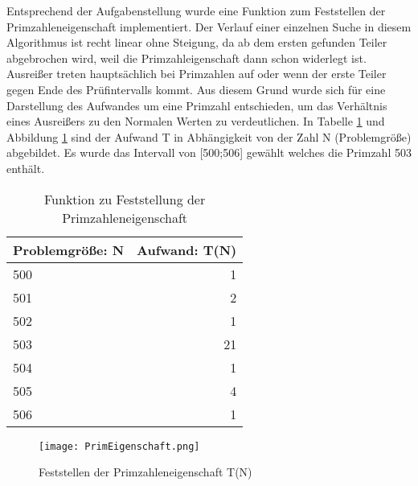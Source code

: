 Entsprechend der Aufgabenstellung wurde eine Funktion zum Feststellen der Primzahleneigenschaft implementiert. Der Verlauf einer einzelnen Suche in diesem Algorithmus ist recht linear ohne Steigung, da ab dem ersten gefunden Teiler abgebrochen wird, weil die Primzahleigenschaft dann schon widerlegt ist. Ausreißer treten hauptsächlich bei Primzahlen auf oder wenn der erste Teiler gegen Ende des Prüfintervalls kommt. Aus diesem Grund wurde sich für eine Darstellung des Aufwandes um eine Primzahl entschieden, um das Verhältnis eines Ausreißers zu den Normalen Werten zu verdeutlichen. 
In Tabelle \ref{tab:Primeigenschaft} und Abbildung \ref{fig:Primeigenschaft} sind der Aufwand T in Abhängigkeit von der Zahl N (Problemgröße) abgebildet. Es wurde das Intervall von [500;506] gewählt welches die Primzahl 503 enthält.


\begin{table}[htbp]
\caption{Funktion zu Feststellung der Primzahleneigenschaft}
\label{tab:Primeigenschaft}
\centering
\begin{tabular}{l|r}
Problemgröße: N	&	Aufwand: T(N)	\\
\hline
500				&	1			\\
501				&	2			\\
502				&	1			\\
503				&	21			\\
504				&	1			\\
505				&	4			\\
506				&	1			\\
\end{tabular}
\end{table}

\begin{figure}[htbp]
\centering
\texttt{[image: PrimEigenschaft.png]}
\caption{Feststellen der Primzahleneigenschaft T(N)}
\label{fig:Primeigenschaft}
\end{figure}